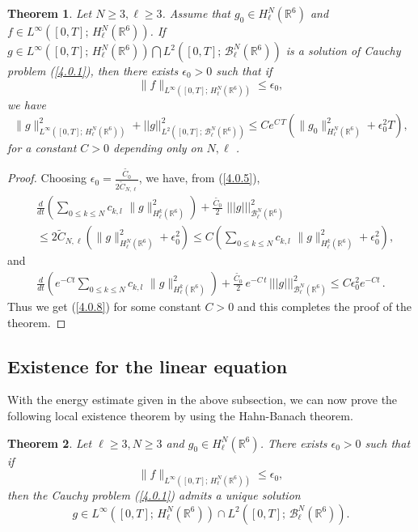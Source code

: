 \documentclass{amsart}[12pt, article]
\newtheorem{theo}{Theorem}[section]
\begin{document}
\begin{theo}\label{theo4.0.1}
Let $N\geq 3, \ell\geq 3$. Assume that $g_0\in H^N_\ell({{{\mathbb R}}}^6)$ and
$f\in L^\infty([0, T];\,H^N_\ell({{{\mathbb R}}}^6))$.  If $g\in L^\infty([0,
T];\,H^N_\ell({{{\mathbb R}}}^6))\bigcap L^2([0, T];\, {{\mathcal B}}^N_\ell({{{\mathbb R}}}^6))$ is a
solution of Cauchy problem (\ref{4.0.1}), then there exists
$\epsilon_0>0$ such that if
\begin{equation*}\label{4.0.7}
\|f\|_{L^\infty([0, T];\,H^N_\ell({{{\mathbb R}}}^6))}\leq \epsilon_0,
\end{equation*}
we have
\begin{equation}\label{4.0.8}
\|g\|^2_{L^\infty([0, T];\,H^N_\ell({{{\mathbb R}}}^6))}+ ||g||^2_{L^2([0,
T];\,{{\mathcal B}}^N_\ell({{{\mathbb R}}}^6))}\leq Ce^{C\,
T}(\|g_0\|^2_{H^N_\ell({{{\mathbb R}}}^6)}+\epsilon_0^2 T),
\end{equation}
for a constant $C>0$ depending only on $N, \ell$ .
\end{theo}

\begin{proof}
Choosing $\epsilon_0=\frac{\widetilde{C_0}}{2\widetilde C_{N, \ell}}$,
we have, {}from (\ref{4.0.5}),
\begin{align*}
&\frac{d}{d t}\left(\sum_{0\leq k\leq N}c_{k,
l}\,\,\|g\|^2_{H^k_\ell({{{\mathbb R}}}^6)}\right)+\frac{\widetilde{C_0}}{2}\,\,
|||g|||^2_{{{\mathcal B}}^{N}_\ell({{{\mathbb R}}}^6)}\\
&\leq 2\widetilde C_{N, \ell} (\|g\|^2_{H^{N}_\ell({{{\mathbb R}}}^6)}+\epsilon_0^2)
 \leq C (\sum_{0\leq k\leq N}c_{k,
l}\,\,\|g\|^2_{H^k_\ell({{{\mathbb R}}}^6)}+\epsilon_0^2),
\end{align*}
and
\begin{align*}
\frac{d}{d t}\left(e^{-Ct
}\sum_{0\leq k\leq N}c_{k,
l}\,\,\|g\|^2_{H^k_\ell({{{\mathbb R}}}^6)}\right)+\frac{\widetilde{C_0}}{2}\,e^{-C\,t }\, |||g|||^2_{{{\mathcal B}}^{N}_\ell({{{\mathbb R}}}^6)}\leq
C\epsilon_0^2e^{-Ct}\,.
\end{align*}
Thus we get (\ref{4.0.8}) for some constant $C>0$ and this completes the proof
of the theorem.
\end{proof}

\subsection{Existence for the linear equation}\label{section4.1}
\setcounter{equation}{0} \smallbreak

With the energy estimate given in the above subsection, we can now prove
the following local existence theorem by using the Hahn-Banach theorem.
\begin{theo}\label{theo4.1.1}
Let $\ell\geq 3, N\geq 3$ and $g_0\in H^{N}_\ell({{{\mathbb R}}}^6)$. There
exists $\epsilon_0>0$ such that if
$$
\|f\|_{L^\infty([0, T];\, H^{N}_\ell({{{\mathbb R}}}^6))}\leq\epsilon_0,
$$
then the Cauchy problem (\ref{4.0.1}) admits a unique solution
$$
g\in L^\infty([0, T];\, H^{N}_\ell({{{\mathbb R}}}^6))\cap L^2([0, T];\,
{{\mathcal B}}^{N}_\ell({{{\mathbb R}}}^6)).
$$
\end{theo}
\end{document}
